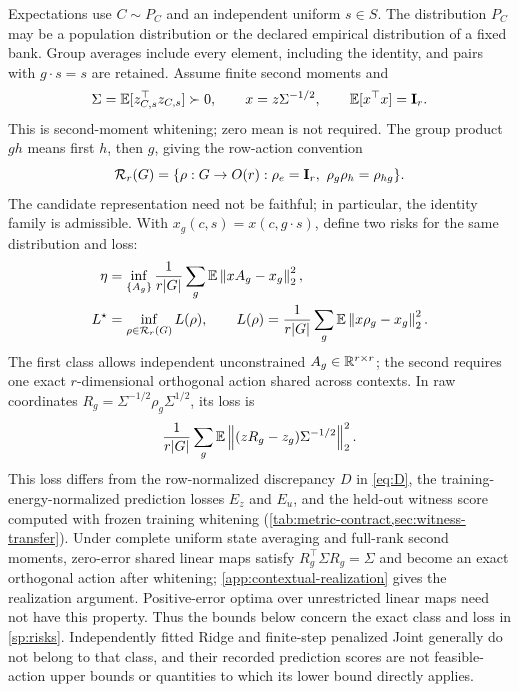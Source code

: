 Expectations use $C\sim P_C$ and an independent uniform $s\in S$. The distribution $P_C$ may be a population distribution or the declared empirical distribution of a fixed bank. Group averages include every element, including the identity, and pairs with $g\cdot s=s$ are retained. Assume finite second moments and
\[
 \Sigma=\mathbb E[z_{C,s}^{\top}z_{C,s}]\succ0,
 \qquad x=z\Sigma^{-1/2},
 \qquad \mathbb E[x^{\top}x]=\mathbf{I}_r.
\]
This is second-moment whitening; zero mean is not required. The group product $gh$ means first $h$, then $g$, giving the row-action convention
\[
 \mathcal R_r(G)=\{\rho:G\to O(r):\rho_e=\Id_r,\ \rho_g\rho_h=\rho_{hg}\}.
\]
The candidate representation need not be faithful; in particular, the identity family is admissible. With $x_g(c,s)=x(c,g\cdot s)$, define two risks for the same distribution and loss:
\begin{equation}
 \begin{aligned}
 \eta
 &=
 \inf_{\{A_g\}}
 \frac1{r|G|}
 \sum_g
 \mathbb E\left\lVert xA_g-x_g\right\rVert_2^2,
 \\
 L^\star
 &=
 \inf_{\rho\in\mathcal R_r(G)}L(\rho),
 \qquad
 L(\rho)
 =
 \frac1{r|G|}
 \sum_g
 \mathbb E\left\lVert x\rho_g-x_g\right\rVert_2^2.
 \end{aligned}
 \label{sp:risks}
\end{equation}
The first class allows independent unconstrained $A_g\in\mathbb{R}^{r\times r}$; the second requires one exact $r$-dimensional orthogonal action shared across contexts. In raw coordinates $R_g=\Sigma^{-1/2}\rho_g\Sigma^{1/2}$, its loss is
\[
 \frac1{r|G|}\sum_g\mathbb E\left\lVert (zR_g-z_g)\Sigma^{-1/2}\right\rVert_2^2.
\]
This loss differs from the row-normalized discrepancy $D$ in \cref{eq:D}, the training-energy-normalized prediction losses $E_z$ and $E_u$, and the held-out witness score computed with frozen training whitening (\cref{tab:metric-contract,sec:witness-transfer}). Under complete uniform state averaging and full-rank second moments, zero-error shared linear maps satisfy $R_g^\top\Sigma R_g=\Sigma$ and become an exact orthogonal action after whitening; \cref{app:contextual-realization} gives the realization argument. Positive-error optima over unrestricted linear maps need not have this property. Thus the bounds below concern the exact class and loss in \cref{sp:risks}. Independently fitted Ridge and finite-step penalized Joint generally do not belong to that class, and their recorded prediction scores are not feasible-action upper bounds or quantities to which its lower bound directly applies.


